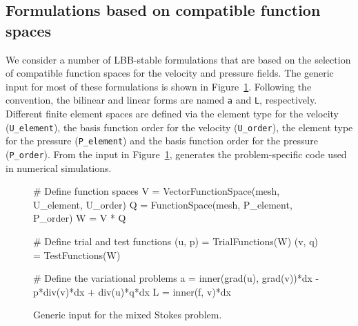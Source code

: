 \subsection{Formulations based on compatible function spaces}

We consider a number of LBB-stable formulations that are based on the
selection of compatible function spaces for the velocity and pressure
fields. The generic \ufl{} input for most of these formulations is shown
in Figure~\ref{code:terrel:var:mixed}.  Following the \ufl{} convention,
the bilinear and linear forms are named {\tt a} and {\tt L}, respectively.
Different finite element spaces are defined via the element type for the
velocity ({\tt U\_element}), the basis function order for the velocity
({\tt U\_order}), the element type for the pressure ({\tt P\_element})
and the basis function order for the pressure ({\tt P\_order}). From
the input in Figure~\ref{code:terrel:var:mixed}, \ffc{} generates the
problem-specific code used in numerical simulations.
%
\begin{figure}
\begin{python}
# Define function spaces
V = VectorFunctionSpace(mesh, U_element, U_order)
Q = FunctionSpace(mesh, P_element, P_order)
W = V * Q

# Define trial and test functions
(u, p) = TrialFunctions(W)
(v, q) = TestFunctions(W)

# Define the variational problems
a = inner(grad(u), grad(v))*dx - p*div(v)*dx + div(u)*q*dx
L = inner(f, v)*dx
\end{python}
\caption{Generic \ufl{} input for the mixed Stokes problem.}
\label{code:terrel:var:mixed}
\end{figure}

